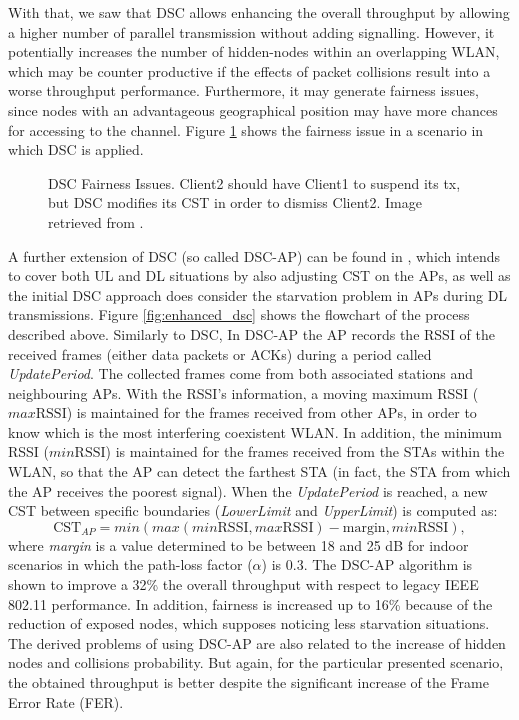 \documentclass[12pt, a4paper,twoside]{tesi_upf}
\begin{document}
			With that, we saw that DSC allows enhancing the overall throughput by allowing a higher number of parallel transmission without adding signalling. However, it potentially increases the number of hidden-nodes within an overlapping WLAN, which may be counter productive if the effects of packet collisions result into a worse throughput performance. Furthermore, it may generate fairness issues, since nodes with an advantageous geographical position may have more chances for accessing to the channel. Figure \ref{fig:dsc_problems} shows the fairness issue in a scenario in which DSC is applied.
			\begin{figure}[h!]
				\centering
				\caption{DSC Fairness Issues. Client2 should have Client1 to suspend its tx, but DSC modifies its CST in order to dismiss Client2. Image retrieved from \cite{zhong2016promise}.}
				\label{fig:dsc_problems}
			\end{figure}
				
			A further extension of DSC (so called DSC-AP) can be found in \cite{afaqui2016dynamic}, which intends to cover both UL and DL situations by also adjusting CST on the APs, as well as the initial DSC approach does consider the starvation problem in APs during DL transmissions. Figure \ref{fig:enhanced_dsc} shows the flowchart of the process described above. Similarly to DSC, In DSC-AP the AP records the RSSI of the received frames (either data packets or ACKs) during a period called \textit{UpdatePeriod}. The collected frames come from both associated stations and neighbouring APs. With the RSSI's information, a moving maximum RSSI ($max\mathrm{RSSI}$) is maintained for the frames received from other APs, in order to know which is the most interfering coexistent WLAN. In addition, the minimum RSSI ($min\mathrm{RSSI}$) is maintained for the frames received from the STAs within the WLAN, so that the AP can detect the farthest STA (in fact, the STA from which the AP receives the poorest signal). When the \textit{UpdatePeriod} is reached, a new CST between specific boundaries (\textit{LowerLimit} and \textit{UpperLimit}) is computed as:
			\begin{equation}
				\mathrm{CST}_{AP} = min(max(min\mathrm{RSSI}, max\mathrm{RSSI})- \text{margin}, min\mathrm{RSSI}),
				\nonumber
			\end{equation}
			where \textit{margin} is a value determined to be between 18 and 25 dB for indoor scenarios in which the path-loss factor ($\alpha$) is 0.3. The DSC-AP algorithm is shown to improve a 32\% the overall throughput with respect to legacy IEEE 802.11 performance. In addition, fairness is increased up to 16\% because of the reduction of exposed nodes, which supposes noticing less starvation situations. The derived problems of using DSC-AP are also related to the increase of hidden nodes and collisions probability. But again, for the particular presented scenario, the obtained throughput is better despite the significant increase of the Frame Error Rate (FER).	
			
\end{document}
